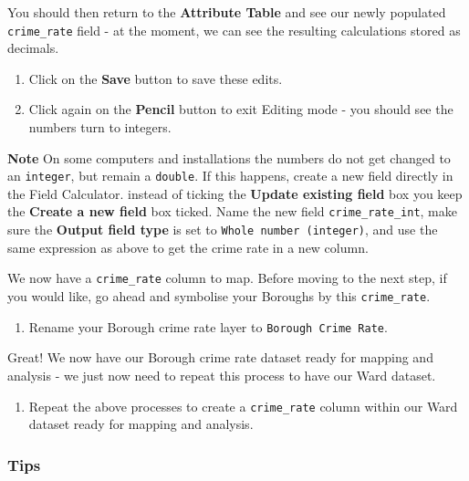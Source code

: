 \documentclass[
]{book}
\providecommand{\tightlist}{%
  \setlength{\itemsep}{0pt}\setlength{\parskip}{0pt}}
\begin{document}
You should then return to the \textbf{Attribute Table} and see our newly populated \texttt{crime\_rate} field - at the moment, we can see the resulting calculations stored as decimals.

\begin{enumerate}
\def\labelenumi{\arabic{enumi}.}
\setcounter{enumi}{10}
\item
  Click on the \textbf{Save} button to save these edits.
\item
  Click again on the \textbf{Pencil} button to exit Editing mode - you should see the numbers turn to integers.
\end{enumerate}

\textbf{Note}
On some computers and installations the numbers do not get changed to an \texttt{integer}, but remain a \texttt{double}. If this happens, create a new field directly in the Field Calculator. instead of ticking the \textbf{Update existing field} box you keep the \textbf{Create a new field} box ticked. Name the new field \texttt{crime\_rate\_int}, make sure the \textbf{Output field type} is set to \texttt{Whole\ number\ (integer)}, and use the same expression as above to get the crime rate in a new column.

We now have a \texttt{crime\_rate} column to map. Before moving to the next step, if you would like, go ahead and symbolise your Boroughs by this \texttt{crime\_rate}.

\begin{enumerate}
\def\labelenumi{\arabic{enumi}.}
\setcounter{enumi}{12}
\tightlist
\item
  Rename your Borough crime rate layer to \texttt{Borough\ Crime\ Rate}.
\end{enumerate}

Great! We now have our Borough crime rate dataset ready for mapping and analysis - we just now need to repeat this process to have our Ward dataset.

\begin{enumerate}
\def\labelenumi{\arabic{enumi}.}
\setcounter{enumi}{13}
\tightlist
\item
  Repeat the above processes to create a \texttt{crime\_rate} column within our Ward dataset ready for mapping and analysis.
\end{enumerate}

\hypertarget{tips}{%
\subsubsection*{Tips}\label{tips}}
\end{document}
